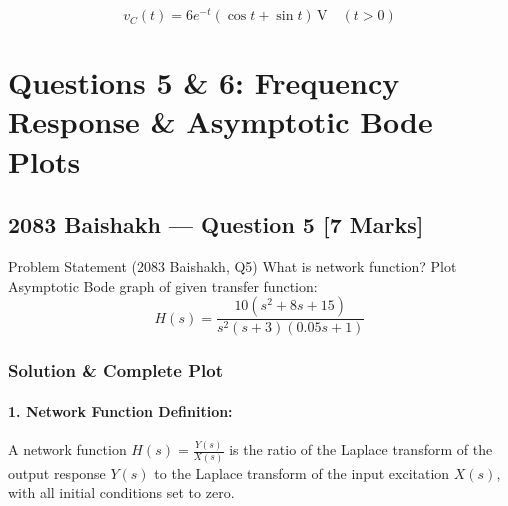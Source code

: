 \documentclass[11pt,a4paper,oneside]{article}
\begin{document}
\begin{answerbox}
\[
v_C(t) = 6 e^{-t}(\cos t + \sin t)\,\mathrm{V} \quad (t > 0)
\]
\end{answerbox}

\newpage

\section{Questions 5 \& 6: Frequency Response \& Asymptotic Bode Plots}

\subsection{2083 Baishakh --- Question 5 [7 Marks]}

\begin{questionbox}{Problem Statement (2083 Baishakh, Q5)}
What is network function? Plot Asymptotic Bode graph of given transfer function:
\[
H(s) = \frac{10(s^2 + 8s + 15)}{s^2(s + 3)(0.05s + 1)}
\]
\end{questionbox}

\subsubsection*{Solution \& Complete Plot}
\paragraph{1. Network Function Definition:}
A network function $H(s) = \frac{Y(s)}{X(s)}$ is the ratio of the Laplace transform of the output response $Y(s)$ to the Laplace transform of the input excitation $X(s)$, with all initial conditions set to zero.
\end{document}
